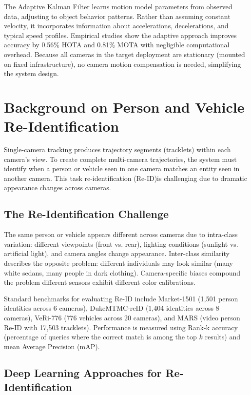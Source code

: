 The Adaptive Kalman Filter learns motion model parameters from observed data, adjusting to object behavior patterns. Rather than assuming constant velocity, it incorporates information about accelerations, decelerations, and typical speed profiles. Empirical studies show the adaptive approach improves accuracy by 0.56\% HOTA and 0.81\% MOTA with negligible computational overhead. Because all cameras in the target deployment are stationary (mounted on fixed infrastructure), no camera motion compensation is needed, simplifying the system design.

\section{Background on Person and Vehicle Re-Identification}

Single-camera tracking produces trajectory segments (tracklets) within each camera's view. To create complete multi-camera trajectories, the system must identify when a person or vehicle seen in one camera matches an entity seen in another camera. This task re-identification (Re-ID)is challenging due to dramatic appearance changes across cameras.

\subsection{The Re-Identification Challenge}

The same person or vehicle appears different across cameras due to intra-class variation: different viewpoints (front vs. rear), lighting conditions (sunlight vs. artificial light), and camera angles change appearance. Inter-class similarity describes the opposite problem: different individuals may look similar (many white sedans, many people in dark clothing). Camera-specific biases compound the problem different sensors exhibit different color calibrations.

Standard benchmarks for evaluating Re-ID include Market-1501 (1,501 person identities across 6 cameras), DukeMTMC-reID (1,404 identities across 8 cameras), VeRi-776 (776 vehicles across 20 cameras), and MARS (video person Re-ID with 17,503 tracklets). Performance is measured using Rank-k accuracy (percentage of queries where the correct match is among the top $k$ results) and mean Average Precision (mAP).

\subsection{Deep Learning Approaches for Re-Identification}

